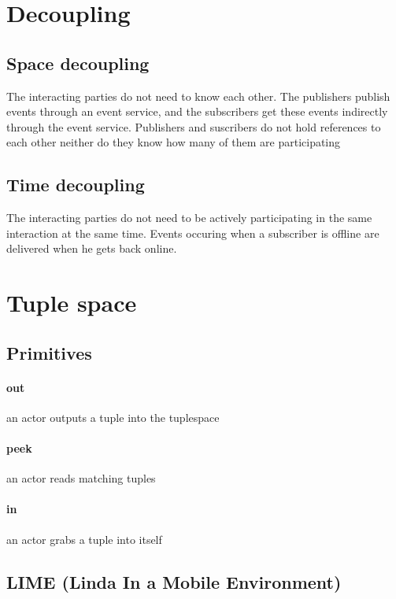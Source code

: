 \documentclass[a4paper]{report}
\begin{document}
\section{Decoupling}

\subsection{Space decoupling}

The interacting parties do not need to know each other. The publishers publish events through an event service, and the subscribers get these events indirectly through the event service. Publishers and suscribers do not hold references to each other neither do they know how many of them are participating

\subsection{Time decoupling}

The interacting parties do not need to be actively participating in the same interaction at the same time. Events occuring when a subscriber is offline are delivered when he gets back online.

\section{Tuple space}

\subsection{Primitives}

\paragraph{out} an actor outputs a tuple into the tuplespace 
\paragraph{peek} an actor reads matching tuples 
\paragraph{in} an actor grabs a tuple into itself

\subsection{LIME (Linda In a Mobile Environment)}
\end{document}
